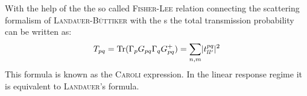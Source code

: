With the help of the the so called \textsc{Fisher-Lee} relation \cite{PhysRevB.23.6851} connecting the scattering formalism of \textsc{Landauer-B\"uttiker} with the \gfnc s the total transmission probability can be written as:
\begin{align}
T_{pq} = \text{Tr}(\Gamma_p G_{pq} \Gamma_q G^+_{pq}) = \sum_{n,m} \lvert t^{pq}_{ll'}\rvert^2
\end{align}
This formula is known as the \textsc{Caroli} expression. In the linear response regime it is equivalent to \textsc{Landauer}'s formula\cite{PhysRevB.72.035450}.
